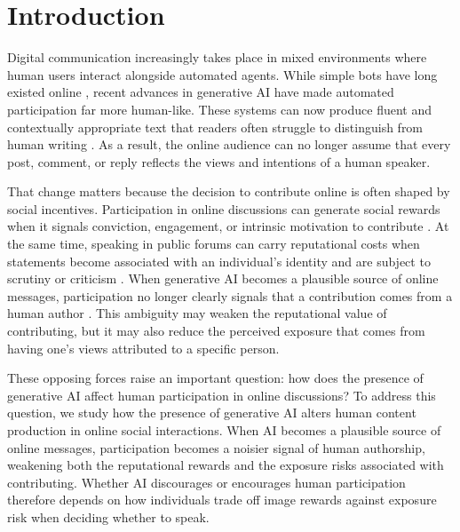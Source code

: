\documentclass[12pt,notitlepage]{article}
\theoremstyle{plain}
\theoremstyle{plain}
\theoremstyle{definition}
\theoremstyle{definition}
\theoremstyle{assumption}
\theoremstyle{plain}
\theoremstyle{plain}
\theoremstyle{plain}
\theoremstyle{plain}
\theoremstyle{definition}%
\theoremstyle{plain}
\theoremstyle{plain}
\theoremstyle{plain}
\theoremstyle{plain}
\begin{document}
\medskip{}

\onehalfspacing 

\newpage{}

\section{Introduction} 

Digital communication increasingly takes place in mixed environments where human users interact alongside automated agents. While simple bots have long existed online \citep{Varol_Ferrara_Davis_Menczer_Flammini_2017}, recent advances in generative AI have made automated participation far more human-like. These systems can now produce fluent and contextually appropriate text that readers often struggle to distinguish from human writing \citep[e.g.][]{brown2020language}. As a result, the online audience can no longer assume that every post, comment, or reply reflects the views and intentions of a human speaker.

That change matters because the decision to contribute online is often shaped by social incentives. Participation in online discussions can generate social rewards when it signals conviction, engagement, or intrinsic motivation to contribute \citep{aridor2024economics}. At the same time, speaking in public forums can carry reputational costs when statements become associated with an individual’s identity and are subject to scrutiny or criticism \citep{BenabouTirole:06,BursztynJensen:17,braghieri2024political}. When generative AI becomes a plausible source of online messages, participation no longer clearly signals that a contribution comes from a human author \citep[e.g.][]{cui2025signaling,galdin2025making}. This ambiguity may weaken the reputational value of contributing, but it may also reduce the perceived exposure that comes from having one's views attributed to a specific person.

These opposing forces raise an important question: how does the presence of generative AI affect human participation in online discussions? To address this question, we study how the presence of generative AI alters human content production in online social interactions. When AI becomes a plausible source of online messages, participation becomes a noisier signal of human authorship, weakening both the reputational rewards and the exposure risks associated with contributing. Whether AI discourages or encourages human participation therefore depends on how individuals trade off image rewards against exposure risk when deciding whether to speak.
\end{document}
